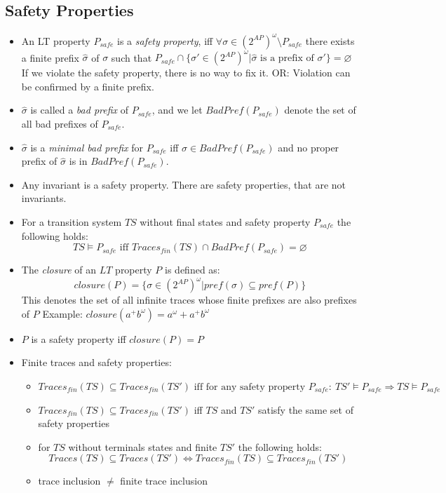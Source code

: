 \documentclass[a4paper, 10pt]{article}
\begin{document}
\subsection*{Safety Properties}
\begin{shaded}
    \begin{itemize}
        \item An LT property $P_{safe}$ is a \emph{safety property}, iff $\forall\sigma\in(2^{AP})^\omega\setminus P_{safe}$ there exists a finite prefix $\hat\sigma$ of $\sigma$ such that $P_{safe}\cap\{ \sigma'\in(2^{AP})^\omega | \hat\sigma \textrm{ is a prefix of } \sigma' \}=\varnothing$ \\{\tiny If we violate the safety property, there is no way to fix it. OR: Violation can be confirmed by a finite prefix.}
        \item $\hat\sigma$ is called a \emph{bad prefix} of $P_{safe}$, and we let $BadPref(P_{safe})$ denote the set of all bad prefixes of $P_{safe}$.
        \item $\hat\sigma$ is a \emph{minimal bad prefix} for $P_{safe}$ iff $\hat\sigma\in BadPref(P_{safe})$ and no proper prefix of $\hat\sigma$ is in $BadPref(P_{safe})$.
        \item Any invariant is a safety property. There are safety properties, that are not invariants.
        \item For a transition system $TS$ without final states and safety property $P_{safe}$ the following holds: \[ TS\models P_{safe} \textrm{ iff } Traces_{fin}(TS)\cap BadPref(P_{safe})=\varnothing \]
        \item The \emph{closure} of an $LT$ property $P$ is defined as: \[ closure(P)=\{ \sigma\in(2^{AP})^\omega | pref(\sigma) \subseteq pref(P) \} \]
        {\tiny This denotes the set of all infinite traces whose finite prefixes are also prefixes of $P$ Example: $closure(a^+b^\omega)=a^\omega+a^+b^\omega$}
        \item $P$ is a safety property iff $closure(P)=P$
    \end{itemize}
\end{shaded}
\begin{itemize}
    \item Finite traces and safety properties:
    \begin{itemize}
        \item $Traces_{fin}(TS)\subseteq Traces_{fin}(TS') \textrm{ iff for any safety property } P_{safe}:\ TS'\models P_{safe} \Rightarrow TS \models P_{safe}$
        \item $Traces_{fin}(TS)\subseteq Traces_{fin}(TS')$ iff $TS$ and $TS'$ satisfy the same set of safety properties
        \item for $TS$ without terminals states and finite $TS'$ the following holds: \[ Traces(TS) \subseteq Traces(TS') \iff Traces_{fin}(TS) \subseteq Traces_{fin}(TS') \]
        \item trace inclusion $\not=$ finite trace inclusion
    \end{itemize}
\end{itemize}
\end{document}

